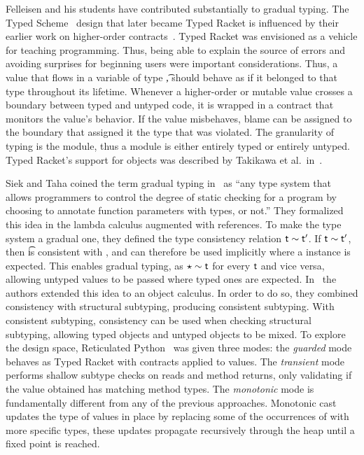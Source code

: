 \documentclass[USenglish]{tex/lipics-v2016}f
\begin{document}
Felleisen and his students have contributed substantially to gradual
typing. The Typed Scheme~\cite{tf-popl08} design that later became Typed
Racket is influenced by their earlier work on higher-order
contracts~\cite{ff-icfp02}. Typed Racket was envisioned as a vehicle for
teaching programming. Thus, being able to explain the source of errors and
avoiding surprises for beginning users were important considerations. Thus,
a value that flows in a variable of type \t, should behave as if it belonged
to that type throughout its lifetime.  Whenever a higher-order or mutable
value crosses a boundary between typed and untyped code, it is wrapped in a
contract that monitors the value's behavior.  If the value misbehaves, blame
can be assigned to the boundary that assigned it the type that was
violated. The granularity of typing is the module, thus a module is either
entirely typed or entirely untyped.  Typed Racket's support for objects was
described by Takikawa et al.~in~\cite{Takikawa:2012}.

Siek and Taha coined the term gradual typing in~\cite{SiekTaha06} as ``any
type system that allows programmers to control the degree of static checking
for a program by choosing to annotate function parameters with types, or
not.'' They formalized this idea in the lambda calculus augmented with
references. To make the type system a gradual one, they defined the type consistency
relation $\t \sim \tp$. If $\t \sim \tp$, then \t is consistent with \tp,
and can therefore be used implicitly where a \tp instance is expected.
This enables gradual typing, as $\any \sim \t$ for every $\t$ and vice versa,
allowing untyped values to be passed where typed ones are expected.
In~\cite{SiekTaha07} the authors extended this idea to an object calculus.
In order to do so, they combined consistency with structural subtyping,
producing consistent subtyping. With consistent subtyping, consistency can be used
when checking structural subtyping, allowing typed objects and untyped objects
to be mixed. 
To explore the design space, Reticulated Python~\cite{siek14} was given
three modes: the \emph{guarded}
mode behaves as Typed Racket with contracts applied to values.  The
\emph{transient} mode performs shallow subtype checks on reads and method
returns, only validating if the value obtained has matching method types.
The \emph{monotonic} mode is fundamentally different from any of the
previous approaches. Monotonic cast updates the type 
of values in place by replacing some of the occurrences of \any with more
specific types, these updates propagate recursively through the heap until
a fixed point is reached.
\end{document}
